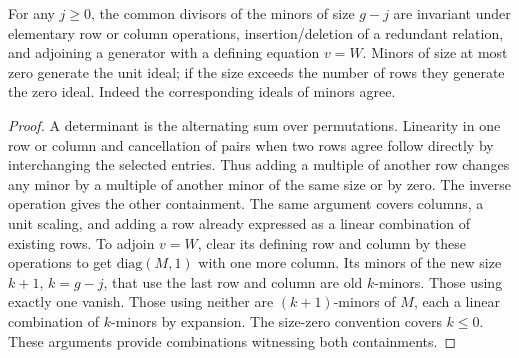 \begin{lemma}
For any $j\ge0$, the common divisors of the minors of size $g-j$ are invariant under elementary row or column operations, insertion/deletion of a redundant relation, and adjoining a generator with a defining equation $v=W$. Minors of size at most zero generate the unit ideal; if the size exceeds the number of rows they generate the zero ideal. Indeed the corresponding ideals of minors agree.
\end{lemma}
\begin{proof}
A determinant is the alternating sum over permutations. Linearity in one row or column and cancellation of pairs when two rows agree follow directly by interchanging the selected entries. Thus adding a multiple of another row changes any minor by a multiple of another minor of the same size or by zero. The inverse operation gives the other containment. The same argument covers columns, a unit scaling, and adding a row already expressed as a linear combination of existing rows. To adjoin $v=W$, clear its defining row and column by these operations to get $\mathrm{diag}(M,1)$ with one more column. Its minors of the new size $k+1$, $k=g-j$, that use the last row and column are old $k$-minors. Those using exactly one vanish. Those using neither are $(k+1)$-minors of $M$, each a linear combination of $k$-minors by expansion. The size-zero convention covers $k\le0$. These arguments provide combinations witnessing both containments.
\end{proof}

